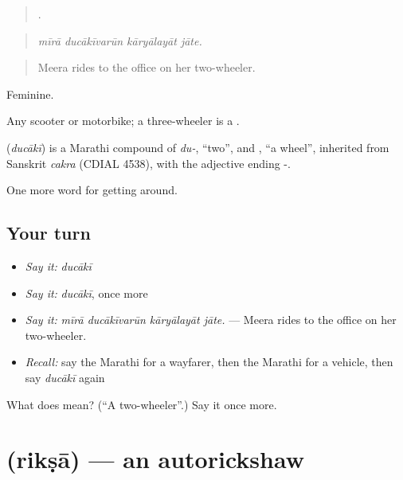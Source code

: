 \begin{quote}
   .
\end{quote}

\begin{quote}
\emph{mīrā ducākīvarūn kāryālayāt jāte.}
\end{quote}

\begin{quote}
Meera rides to the office on her two-wheeler.
\end{quote}

Feminine.

Any scooter or motorbike; a three-wheeler is a .

\begin{cousinweb}
\textbf{} (\emph{ducākī}) is a Marathi compound of \emph{du-}, \textquotedblleft{}two\textquotedblright{}, and \textbf{}, \textquotedblleft{}a wheel\textquotedblright{}, inherited from Sanskrit \emph{cakra} (CDIAL 4538), with the adjective ending -.
\end{cousinweb}

\begin{grammarlens}[title={What you've built}]
One more word for getting around.
\end{grammarlens}

\subsection*{Your turn}
\begin{itemize}
\raggedright
  \item \emph{Say it:} \emph{ducākī}
  \item \emph{Say it:} \emph{ducākī}, once more
  \item \emph{Say it:} \emph{mīrā ducākīvarūn kāryālayāt jāte.} — Meera rides to the office on her two-wheeler.
  \item \emph{Recall:} say the Marathi for a wayfarer, then the Marathi for a vehicle, then say \emph{ducākī} again
\end{itemize}

\begin{tcolorbox}[breakable,colback=teal!4,colframe=teal!35!black,title={Before you move on}]
What does  mean? (\textquotedblleft{}A two-wheeler\textquotedblright{}.) Say it once more.
\end{tcolorbox}
\section[\texorpdfstring{\mr{रिक्षा} (rikṣā)}{रिक्षा (rikṣā)}]{ (rikṣā) — an autorickshaw}

